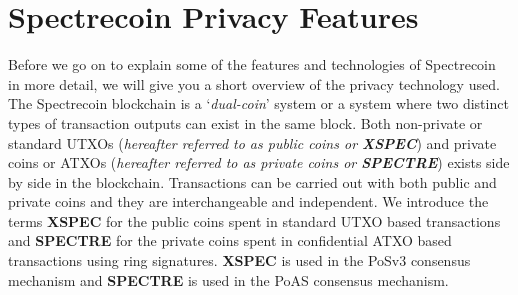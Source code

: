 \section{Spectrecoin Privacy Features}
Before we go on to explain some of the features and technologies of
Spectrecoin in more detail, we will give you a short overview of the
privacy technology used. The Spectrecoin blockchain is a ‘\textit{dual-coin}’
system or a system where two distinct types of transaction outputs can
exist in the same block. Both non-private or standard UTXOs (\textit{hereafter
referred to as public coins or \textbf{XSPEC}}) and private coins or ATXOs 
(\textit{hereafter referred to as private coins or \textbf{SPECTRE}}) exists 
side by side in the blockchain. Transactions can be carried out with both 
public and private coins and they are interchangeable and independent. We 
introduce the terms \textbf{XSPEC} for the public coins spent in standard UTXO based 
transactions and \textbf{SPECTRE} for the private coins spent in  confidential ATXO based
transactions using ring signatures. \textbf{XSPEC} is used in the PoSv3 consensus
mechanism and \textbf{SPECTRE} is used in the PoAS consensus mechanism.



